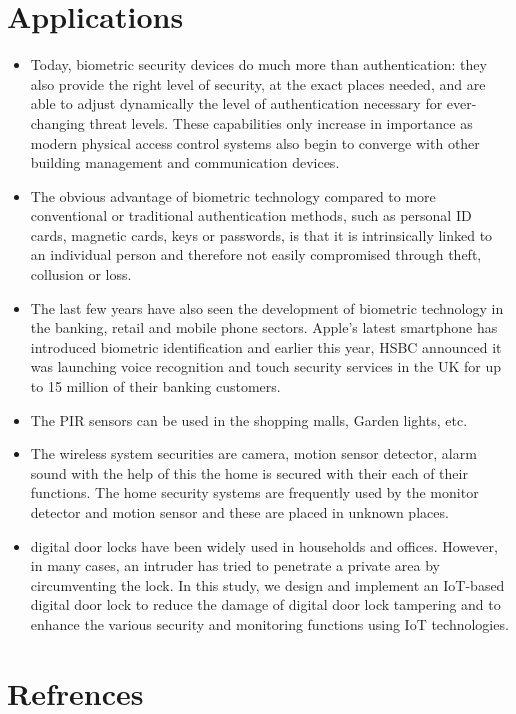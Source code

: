 \documentclass[twoside,a4paper,16pt]{book}
\begin{document}
{ \section{Applications}
 \begin{itemize}
 	\item  Today, biometric security devices do much more than authentication: they also provide the right level of security, at the exact places needed, and are able to adjust dynamically the level of authentication necessary for ever-changing threat levels. These capabilities only increase in importance as modern physical access control systems also begin to converge with other building management and communication devices.
 	\item The obvious advantage of biometric technology compared to more conventional or traditional authentication methods, such as personal ID cards, magnetic cards, keys or passwords, is that it is intrinsically linked to an individual person and therefore not easily compromised through theft, collusion or loss.
 	\item The last few years have also seen the development of biometric technology in the banking, retail and mobile phone sectors. Apple’s latest smartphone has introduced biometric identification and earlier this year, HSBC announced it was launching voice recognition and touch security services in the UK for up to 15 million of their banking customers.
 	\item The PIR sensors can be used in the shopping malls, Garden lights, etc.
 	\item The wireless system securities are camera, motion sensor detector, alarm sound with the help of this the home is secured with their each of their functions. The home security systems are frequently used by the monitor detector and motion sensor and these are placed in unknown places.
 	\item digital door locks have been widely used in households and offices. However, in many cases, an intruder has tried to penetrate a private area by circumventing the lock. In this study, we design and implement an IoT-based digital door lock to reduce the damage of digital door lock tampering and to enhance the various security and monitoring functions using IoT technologies.
 \end{itemize}

\section{Refrences}

}
\end{document}
